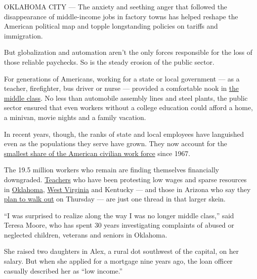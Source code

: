 OKLAHOMA CITY --- The anxiety and seething anger that followed the
disappearance of middle-income jobs in factory towns has helped reshape
the American political map and topple longstanding policies on tariffs
and immigration.

But globalization and automation aren't the only forces responsible for
the loss of those reliable paychecks. So is the steady erosion of the
public sector.

For generations of Americans, working for a state or local government
--- as a teacher, firefighter, bus driver or nurse --- provided a
comfortable nook in
\href{https://www.nytimes3xbfgragh.onion/2015/04/11/business/economy/middle-class-but-feeling-economically-insecure.html}{the
middle class}. No less than automobile assembly lines and steel plants,
the public sector ensured that even workers without a college education
could afford a home, a minivan, movie nights and a family vacation.

In recent years, though, the ranks of state and local employees have
languished even as the populations they serve have grown. They now
account for the
\href{https://fred.stlouisfed.org/graph/?g=ju4l}{smallest share of the
American civilian work force} since 1967.

The 19.5 million workers who remain are finding themselves financially
downgraded.
\href{https://www.nytimes3xbfgragh.onion/2018/04/02/us/teacher-strikes-oklahoma-kentucky.html}{Teachers}
who have been protesting low wages and sparse resources in
\href{https://www.nytimes3xbfgragh.onion/2018/04/12/us/oklahoma-teachers-strike.html}{Oklahoma},
\href{https://www.nytimes3xbfgragh.onion/2018/03/06/us/west-virginia-teachers-strike-deal.html?action=click\&contentCollection=U.S.\&module=RelatedCoverage\&region=Marginalia\&pgtype=article}{West
Virginia} and Kentucky --- and those in Arizona who say they
\href{https://www.npr.org/2018/04/22/604702008/arizona-teachers-plan-to-strike-on-thursday}{plan
to walk out} on Thursday --- are just one thread in that larger skein.

``I was surprised to realize along the way I was no longer middle
class,'' said Teresa Moore, who has spent 30 years investigating
complaints of abused or neglected children, veterans and seniors in
Oklahoma.

She raised two daughters in Alex, a rural dot southwest of the capital,
on her salary. But when she applied for a mortgage nine years ago, the
loan officer casually described her as ``low income.''

